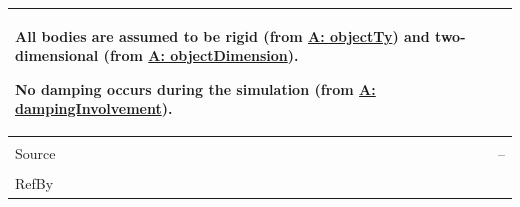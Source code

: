 \documentclass[12pt]{article}
\begin{document}
\begin{minipage}{\textwidth}
\begin{tabular}{>{\raggedright}p{}>{\raggedright\arraybackslash}p{}}
        All bodies are assumed to be rigid (from \hyperref[assumpOT]{A: objectTy}) and two-dimensional (from \hyperref[assumpOD]{A: objectDimension}).
        
        No damping occurs during the simulation (from \hyperref[assumpDI]{A: dampingInvolvement}).
        
\\ \midrule \\
Source & --
         
\\ \midrule \\
RefBy & 
\\ \bottomrule
\end{tabular}
\end{minipage}

\vspace{\baselineskip}
\noindent
\end{document}
